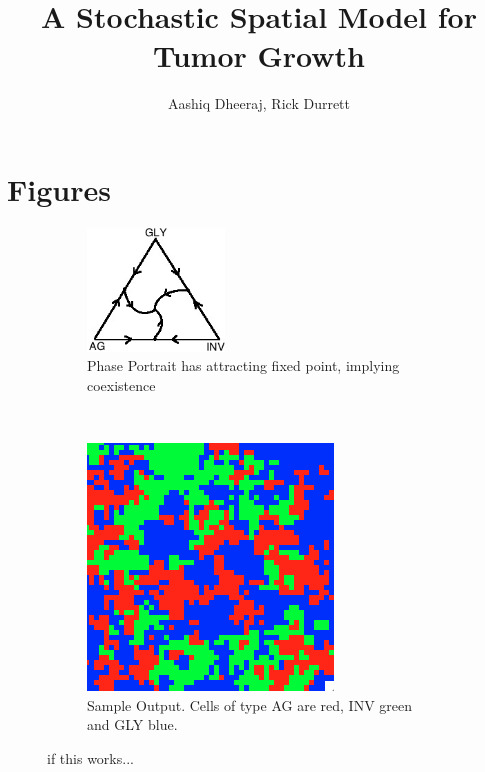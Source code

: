 \documentclass[12pt]{amsart}
\title{A Stochastic Spatial Model for Tumor Growth}
\author{Aashiq Dheeraj, Rick Durrett}
\begin{document}
\maketitle

\section{Figures}
\begin{figure}[ht]

	\begin{subfigure}[b]{0.5 \textwidth}
		\includegraphics[width = 0.4\textwidth]{Diagrams/Basanta/phase}
		\caption{Phase Portrait has attracting fixed point, implying coexistence}
	\end{subfigure}
	~~~
	\begin{subfigure}[b]{0.5 \textwidth}
		\includegraphics[width = 0.4 \textwidth]{Diagrams/Basanta/sample}
		\caption{Sample Output. Cells of type AG are red, INV green and GLY blue.}
	\end{subfigure}

\caption{if this works...}
\end{figure}
\end{document}
